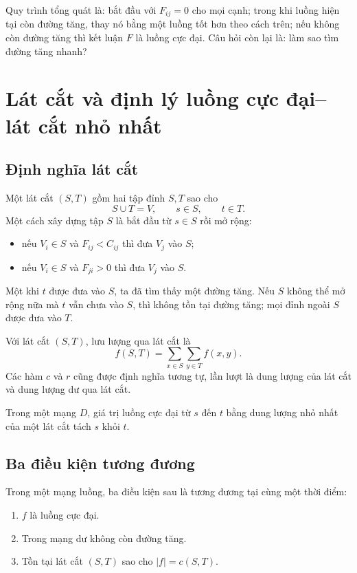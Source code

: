 \documentclass[11pt]{article}
\begin{document}
Quy trình tổng quát là: bắt đầu với $F_{ij}=0$ cho mọi cạnh; trong khi luồng
hiện tại còn đường tăng, thay nó bằng một luồng tốt hơn theo cách trên; nếu
không còn đường tăng thì kết luận $F$ là luồng cực đại. Câu hỏi còn lại là:
làm sao tìm đường tăng nhanh?

\section{Lát cắt và định lý luồng cực đại--lát cắt nhỏ nhất}

\subsection{Định nghĩa lát cắt}

Một lát cắt $(S,T)$ gồm hai tập đỉnh $S,T$ sao cho
\[
  S\cup T=V,\qquad s\in S,\qquad t\in T.
\]
Một cách xây dựng tập $S$ là bắt đầu từ $s\in S$ rồi mở rộng:
\begin{itemize}
  \item nếu $V_i\in S$ và $F_{ij}<C_{ij}$ thì đưa $V_j$ vào $S$;
  \item nếu $V_i\in S$ và $F_{ji}>0$ thì đưa $V_j$ vào $S$.
\end{itemize}
Một khi $t$ được đưa vào $S$, ta đã tìm thấy một đường tăng. Nếu $S$ không thể
mở rộng nữa mà $t$ vẫn chưa vào $S$, thì không tồn tại đường tăng; mọi đỉnh
ngoài $S$ được đưa vào $T$.

Với lát cắt $(S,T)$, lưu lượng qua lát cắt là
\[
  f(S,T)=\sum_{x\in S}\sum_{y\in T} f(x,y).
\]
Các hàm $c$ và $r$ cũng được định nghĩa tương tự, lần lượt là dung lượng của
lát cắt và dung lượng dư qua lát cắt.

 Trong một mạng $D$, giá trị
luồng cực đại từ $s$ đến $t$ bằng dung lượng nhỏ nhất của một lát cắt tách
$s$ khỏi $t$.

\subsection{Ba điều kiện tương đương}

Trong một mạng luồng, ba điều kiện sau là tương đương tại cùng một thời điểm:

\begin{enumerate}
  \item $f$ là luồng cực đại.
  \item Trong mạng dư không còn đường tăng.
  \item Tồn tại lát cắt $(S,T)$ sao cho $|f|=c(S,T)$.
\end{enumerate}
\end{document}
